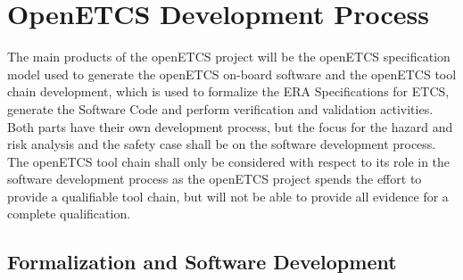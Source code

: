 \documentclass{template/openetcs_report}
\begin{document}




\chapter{OpenETCS Development Process}
\label{sec:development-process}

The main products of the openETCS project will be the openETCS specification model used to generate the openETCS on-board software and the openETCS tool chain development, which is used to formalize the ERA Specifications for ETCS, generate the Software Code and perform verification and validation activities. Both parts have their own development process, but the focus for the hazard and risk analysis and the safety case shall be on the software development process. The openETCS tool chain shall only be considered with respect to its role in the software development process as the openETCS project spends the effort to provide a qualifiable tool chain, but will not be able to provide all evidence for a complete qualification.

\section{Formalization and Software Development}
\end{document}
